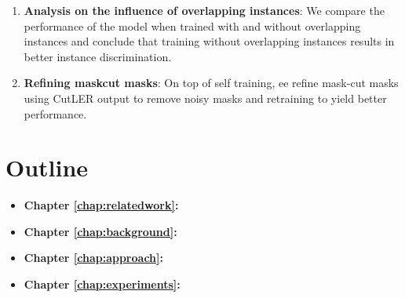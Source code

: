 \begin{enumerate}
    
    \item \textbf{Analysis on the influence of overlapping instances}: We compare the performance of the model when trained with and without overlapping instances and conclude that training without overlapping instances results in better instance discrimination.

    \item \textbf{Refining maskcut masks}: On top of self training, ee refine mask-cut masks using CutLER output to remove noisy masks and retraining to yield better performance.
\end{enumerate}


\section{Outline}
\begin{itemize}
    \item \textbf{Chapter \ref{chap:relatedwork}:} %
    
    \item \textbf{Chapter \ref{chap:background}:} %
    
    \item \textbf{Chapter \ref{chap:approach}:} %
    
    \item \textbf{Chapter \ref{chap:experiments}:} %
\end{itemize}